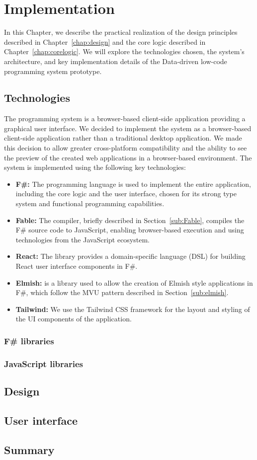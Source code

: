 \chapter{Implementation}
\label{chap:implementation}

In this Chapter, we describe the practical realization of the design principles described in Chapter~\ref{chap:design} and the core logic described in Chapter~\ref{chap:corelogic}.
We will explore the technologies chosen, the system's architecture, and key implementation details of the Data-driven low-code programming system prototype.


\section{Technologies}
\label{sec:technologies}

The programming system is a browser-based client-side application providing a graphical user interface.
We decided to implement the system as a browser-based client-side application rather than a traditional desktop application.
We made this decision to allow greater cross-platform compatibility and the ability to see the preview of the created web applications in a browser-based environment.
The system is implemented using the following key technologies:
\begin{itemize}
	\item \textbf{F\#:} The \citet{fsharp} programming language is used to implement the entire application, including the core logic and the user interface, chosen for its strong type system and functional programming capabilities.
	\item \textbf{Fable:} The \citet{fable} compiler, briefly described in Section~\ref{sub:Fable}, compiles the F\# source code to JavaScript, enabling browser-based execution and using technologies from the JavaScript ecosystem.
	\item \textbf{React:} The \citet{feliz} library provides a domain-specific language (DSL) for building React user interface components in F\#.
	\item \textbf{Elmish:} \citet{elmish} is a library used to allow the creation of Elmish style applications in F\#, which follow the MVU pattern described in Section~\ref{sub:elmish}.
	\item \textbf{Tailwind:} We use the Tailwind CSS framework for the layout and styling of the UI components of the application.
\end{itemize}




\subsection{F\# libraries}
\subsection{JavaScript libraries}


\section{Design}
\label{sec:appDesign}
\section{User interface}
\label{sec:ui}
\section{Summary}
